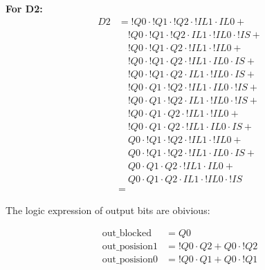 \textbf{For D2:}
\begin{align*}
    D2 &= !Q0 \cdot !Q1 \cdot !Q2 \cdot !IL1 \cdot IL0 + \\
       &\quad !Q0 \cdot !Q1 \cdot !Q2 \cdot IL1 \cdot !IL0 \cdot !IS + \\
       &\quad !Q0 \cdot !Q1 \cdot Q2 \cdot !IL1 \cdot !IL0 + \\
       &\quad !Q0 \cdot !Q1 \cdot Q2 \cdot !IL1 \cdot IL0 \cdot IS + \\
       &\quad !Q0 \cdot !Q1 \cdot Q2 \cdot IL1 \cdot !IL0 \cdot IS + \\
       &\quad !Q0 \cdot Q1 \cdot !Q2 \cdot !IL1 \cdot IL0 \cdot !IS + \\
       &\quad !Q0 \cdot Q1 \cdot !Q2 \cdot IL1 \cdot !IL0 \cdot !IS + \\
       &\quad !Q0 \cdot Q1 \cdot Q2 \cdot !IL1 \cdot !IL0 + \\
       &\quad !Q0 \cdot Q1 \cdot Q2 \cdot !IL1 \cdot IL0 \cdot IS + \\
       &\quad Q0 \cdot !Q1 \cdot !Q2 \cdot !IL1 \cdot !IL0 + \\
       &\quad Q0 \cdot !Q1 \cdot !Q2 \cdot !IL1 \cdot IL0 \cdot IS + \\
       &\quad Q0 \cdot Q1 \cdot Q2 \cdot !IL1 \cdot IL0 + \\
       &\quad Q0 \cdot Q1 \cdot Q2 \cdot IL1 \cdot !IL0 \cdot !IS \\
    &= 
\end{align*}

\noindent
The logic expression of output bits are obivious:

\begin{align*}
    \text{out\_blocked} &=  Q0 \\
    \text{out\_posision1} &= !Q0 \cdot Q2 + Q0 \cdot !Q2 \\
    \text{out\_posision0} &= !Q0 \cdot Q1 + Q0 \cdot !Q1
\end{align*}

